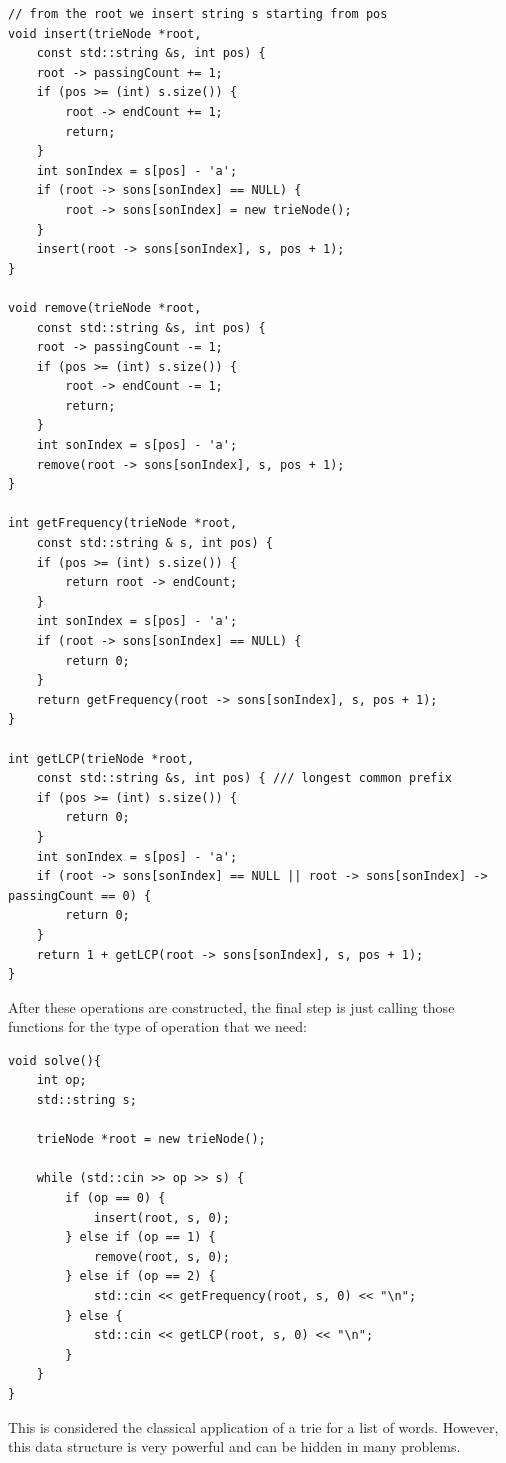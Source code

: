 \documentclass[letterpaper]{article}
\begin{document}
\begin{lstlisting}
// from the root we insert string s starting from pos
void insert(trieNode *root,
    const std::string &s, int pos) {
    root -> passingCount += 1;
    if (pos >= (int) s.size()) {
        root -> endCount += 1;
        return;
    }
    int sonIndex = s[pos] - 'a';
    if (root -> sons[sonIndex] == NULL) {
        root -> sons[sonIndex] = new trieNode();
    }
    insert(root -> sons[sonIndex], s, pos + 1);
}

void remove(trieNode *root,
    const std::string &s, int pos) {
    root -> passingCount -= 1;
    if (pos >= (int) s.size()) {
        root -> endCount -= 1;
        return;
    }
    int sonIndex = s[pos] - 'a';
    remove(root -> sons[sonIndex], s, pos + 1);
}

int getFrequency(trieNode *root,
    const std::string & s, int pos) {
    if (pos >= (int) s.size()) {
        return root -> endCount;
    }
    int sonIndex = s[pos] - 'a';
    if (root -> sons[sonIndex] == NULL) {
        return 0;
    }
    return getFrequency(root -> sons[sonIndex], s, pos + 1);
}

int getLCP(trieNode *root,
    const std::string &s, int pos) { /// longest common prefix
    if (pos >= (int) s.size()) {
        return 0;
    }
    int sonIndex = s[pos] - 'a';
    if (root -> sons[sonIndex] == NULL || root -> sons[sonIndex] -> passingCount == 0) {
        return 0;
    }
    return 1 + getLCP(root -> sons[sonIndex], s, pos + 1);
}
\end{lstlisting}

After these operations are constructed, the final step is just calling those functions for the type of operation that we need:

\begin{lstlisting}
void solve(){
    int op;
    std::string s;

    trieNode *root = new trieNode();

    while (std::cin >> op >> s) {
        if (op == 0) {
            insert(root, s, 0);
        } else if (op == 1) {
            remove(root, s, 0);
        } else if (op == 2) {
            std::cin << getFrequency(root, s, 0) << "\n";
        } else {
            std::cin << getLCP(root, s, 0) << "\n";
        }
    }
}
\end{lstlisting}

This is considered the classical application of a trie for a list of words. However, this data structure is very powerful and can be hidden in many problems.
\end{document}
